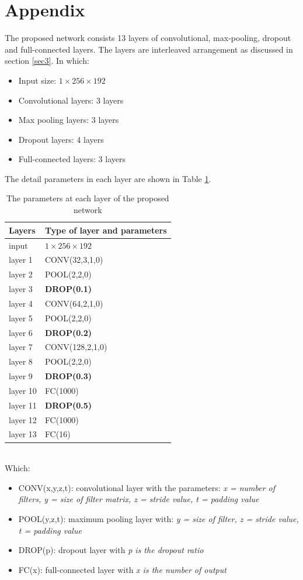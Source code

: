 \documentclass[conference]{IEEEtran}
\begin{document}


\section*{Appendix}
The proposed network consists 13 layers of convolutional, max-pooling, dropout and full-connected layers. The layers are interleaved arrangement as discussed in section \ref{sec3}. In which:
\begin{itemize}
	\item Input size: $1 \times 256 \times 192$
	\item Convolutional layers: 3 layers
	\item Max pooling layers: 3 layers
	\item Dropout layers: 4 layers
	\item Full-connected layers: 3 layers
\end{itemize}


The detail parameters in each layer are shown in Table \ref{modelparameters}.
\begin{table}[htbp]
	\caption{The parameters at each layer of the proposed network}
	\centering
	\begin{tabular}{| l |  p{4cm} | }
	\hline
		Layers &  Type of layer and parameters  \\ \hline
		input & $1 \times 256 \times 192$ \\ \hline
 		layer 1 & CONV(32,3,1,0) \\ \hline
		layer 2 & POOL(2,2,0) \\ \hline
		layer 3 & \textbf{DROP(0.1)} \\ \hline
		layer 4 & CONV(64,2,1,0) \\ \hline
		layer 5 & POOL(2,2,0) \\ \hline
		layer 6 & \textbf{DROP(0.2)} \\ \hline
		layer 7 & CONV(128,2,1,0) \\ \hline
		layer 8 & POOL(2,2,0) \\ \hline
		layer 9 & \textbf{DROP(0.3)} \\ \hline
		layer 10 & FC(1000) \\ \hline
		layer 11 & \textbf{DROP(0.5)} \\ \hline
		layer 12& FC(1000) \\ \hline
		layer 13 & FC(16) \\ \hline
	\end{tabular}
	\label{modelparameters}
\end{table}~\\[1cm]
Which:
\begin{itemize}
	\item CONV(x,y,z,t): convolutional layer with the parameters: \textit{x = number of filters, y = size of filter matrix, z = stride value, t = padding value}
	\item POOL(y,z,t): maximum pooling layer with: \textit{y = size of filter, z = stride value, t = padding value}
	\item DROP(p): dropout layer with \textit{p is the dropout ratio}
	\item FC(x): full-connected layer with \textit{x is the number of output}
\end{itemize}
\end{document}
